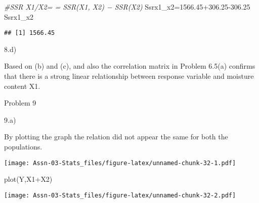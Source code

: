 \documentclass[
]{article}
\newenvironment{Shaded}{\begin{snugshade}}{\end{snugshade}}
\newcommand{\AttributeTok}[1]{\textcolor[rgb]{0.77,0.63,0.00}{#1}}
\newcommand{\CommentTok}[1]{\textcolor[rgb]{0.56,0.35,0.01}{\textit{#1}}}
\newcommand{\ConstantTok}[1]{\textcolor[rgb]{0.00,0.00,0.00}{#1}}
\newcommand{\FloatTok}[1]{\textcolor[rgb]{0.00,0.00,0.81}{#1}}
\newcommand{\FunctionTok}[1]{\textcolor[rgb]{0.00,0.00,0.00}{#1}}
\newcommand{\NormalTok}[1]{#1}
\newcommand{\OtherTok}[1]{\textcolor[rgb]{0.56,0.35,0.01}{#1}}
\newcommand{\SpecialCharTok}[1]{\textcolor[rgb]{0.00,0.00,0.00}{#1}}
\newcommand{\StringTok}[1]{\textcolor[rgb]{0.31,0.60,0.02}{#1}}
\begin{document}
\begin{Shaded}
\begin{Highlighting}[]
\CommentTok{\#SSR X1/X2= = SSR(X1, X2) − SSR(X2)}
\NormalTok{Ssrx1\_x2}\OtherTok{=}\FloatTok{1566.45+306.25{-}306.25}
\NormalTok{Ssrx1\_x2}
\end{Highlighting}
\end{Shaded}

\begin{verbatim}
## [1] 1566.45
\end{verbatim}

8.d)

Based on (b) and (c), and also the correlation matrix in Problem 6.5(a)
confirms that there is a strong linear relationship between response
variable and moisture content X1.

Problem 9

9.a)

By plotting the graph the relation did not appear the same for both the
populations.

\begin{Shaded}
\end{Shaded}

\texttt{[image: Assn-03-Stats\_files/figure-latex/unnamed-chunk-32-1.pdf]}

\begin{Shaded}
\begin{Highlighting}[]
\FunctionTok{plot}\NormalTok{(Y,X1}\SpecialCharTok{+}\NormalTok{X2)}
\end{Highlighting}
\end{Shaded}

\texttt{[image: Assn-03-Stats\_files/figure-latex/unnamed-chunk-32-2.pdf]}
\end{document}
